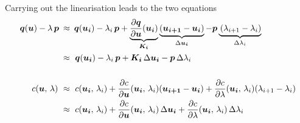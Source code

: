 Carrying out the linearisation leads to the two equations
%
\begin{align}
\boldsymbol{q}(\boldsymbol{u}) - \lambda\,\boldsymbol{p}\:&\approx\:\boldsymbol{q}(\boldsymbol{u_{i}}) - \lambda_i\,\boldsymbol{p} + 
\underbrace{
\frac{\partial \boldsymbol{q}}{\partial \boldsymbol{u}}(\boldsymbol{u_{i}})
}_{\boldsymbol{K_{i}}}
\underbrace{
(\boldsymbol{u_{i+1}} - \boldsymbol{u_{i}})
}_{\Delta\boldsymbol{u_{i}}}
- \boldsymbol{p}
\underbrace{
\,(\lambda_{i+1} - \lambda_{i})
}_{\Delta \lambda_{i}}
\notag\\
&\approx\ \boldsymbol{q}(\boldsymbol{u_{i}}) - \lambda_i\,\boldsymbol{p} + \boldsymbol{K_{i}}\,\Delta\boldsymbol{u_{i}} - \boldsymbol{p}\,\Delta \lambda_{i}\label{eq:equilibrium_dc_lin}\\
\notag\\
c(\boldsymbol{u},\,\lambda) \ &\approx\ c(\boldsymbol{u_{i}},\,\lambda_{i}) + \frac{\partial c}{\partial \boldsymbol{u}}(\boldsymbol{u_{i}},\,\lambda_{i})(\boldsymbol{u_{i+1}} - \boldsymbol{u_{i}}) + \frac{\partial c}{\partial \lambda}(\boldsymbol{u_{i}},\,\lambda_{i})(\lambda_{i+1} - \lambda_{i})\notag\\
&\approx\ c(\boldsymbol{u_{i}},\,\lambda_{i}) + \frac{\partial c}{\partial \boldsymbol{u}}(\boldsymbol{u_{i}},\,\lambda_{i})\,\Delta\boldsymbol{u_{i}} + \frac{\partial c}{\partial \lambda}(\boldsymbol{u_{i}},\,\lambda_{i})\,\Delta \lambda_{i}\label{eq:constraints_dc_lin}
\end{align}

